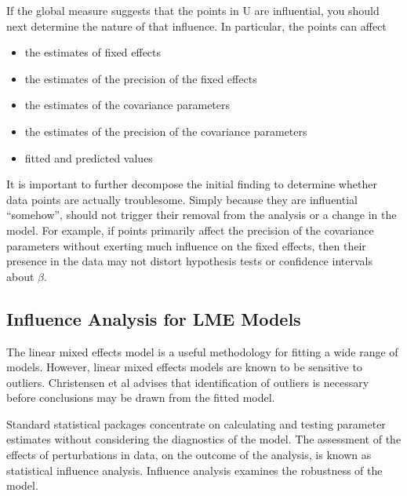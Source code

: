 \documentclass[Main.tex]{subfiles}
\begin{document}
		
		If the global measure suggests that the points in U are influential, you should next determine the nature of
		that influence. In particular, the points can affect
		\begin{itemize}
			\item the estimates of fixed effects
			\item the estimates of the precision of the fixed effects
			\item the estimates of the covariance parameters
			\item the estimates of the precision of the covariance parameters
			\item fitted and predicted values
		\end{itemize}
		
		It is important to further decompose the initial finding to determine whether data points are actually troublesome.
		Simply because they are influential “somehow”, should not trigger their removal from the analysis or
		a change in the model. For example, if points primarily affect the precision of the covariance parameters
		without exerting much influence on the fixed effects, then their presence in the data may not distort hypothesis
		tests or confidence intervals about $\beta$.
		
		
		
		\subsection*{Influence Analysis for LME Models} %
		The linear mixed effects model is a useful methodology for fitting a wide range of models. However, linear mixed effects models are known to be sensitive to outliers. Christensen et al advises that identification of outliers is necessary before conclusions may be drawn from the fitted model.
		
		Standard statistical packages concentrate on calculating and testing parameter estimates without considering the diagnostics of the model. The assessment of the effects of perturbations in data, on the outcome of the analysis, is known as statistical influence analysis. Influence analysis examines the robustness of the model. 
		
\end{document}
